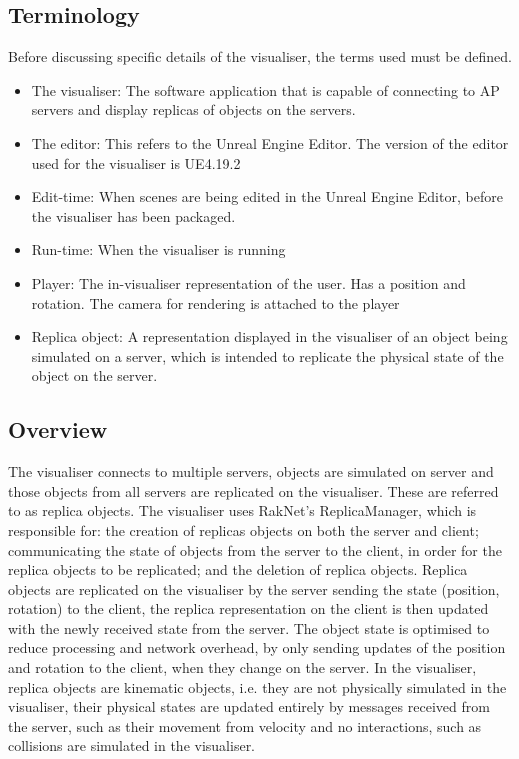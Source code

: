 \subsection{Terminology}
Before discussing specific details of the visualiser, the terms used must be defined.
\begin{itemize}
	\item The visualiser: The software application that is capable of connecting to AP servers and display replicas of objects on the servers.
	\item The editor: This refers to the Unreal Engine Editor. The version of the editor used for the visualiser is UE4.19.2
	\item Edit-time: When scenes are being edited in the Unreal Engine Editor, before the visualiser has been packaged.
	\item Run-time: When the visualiser is running
	\item Player: The in-visualiser representation of the user. Has a position and rotation. The camera for rendering is attached to the player
	\item Replica object: A representation displayed in the visualiser of an object being simulated on a server, which is intended to replicate the physical state of the object on the server.
\end{itemize}

\subsection{Overview}
The visualiser connects to multiple servers, objects are simulated on server and those objects from all servers are replicated on the visualiser. These are referred to as replica objects. The visualiser uses RakNet's ReplicaManager, which is responsible for: the creation of replicas objects on both the server and client; communicating the state of objects from the server to the client, in order for the replica objects to be replicated; and the deletion of replica objects. Replica objects are replicated on the visualiser by the server sending the state (position, rotation) to the client, the replica representation on the client is then updated with the newly received state from the server. The object state is optimised to reduce processing and network overhead, by only sending updates of the position and rotation to the client, when they change on the server. In the visualiser, replica objects are kinematic objects, i.e. they are not physically simulated in the visualiser, their physical states are updated entirely by messages received from the server, such as their movement from velocity and no interactions, such as collisions are simulated in the visualiser.


